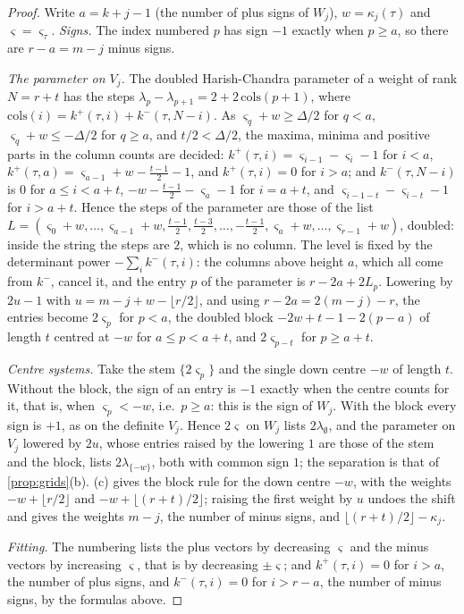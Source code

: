 \begin{proof}
Write $a=k+j-1$ (the number of plus signs of $W_j$), $w=\kappa_j(\tau)$ and $\varsigma=\varsigma_\tau$. \emph{Signs.} The index numbered $p$ has sign $-1$ exactly when $p\ge a$, so there are $r-a=m-j$ minus signs.

\emph{The parameter on $V_j$.} The doubled Harish-Chandra parameter of a weight of rank $N=r+t$ has the steps $\lambda_p-\lambda_{p+1}=2+2\,\mathrm{cols}(p+1)$, where $\mathrm{cols}(i)=k^+(\tau,i)+k^-(\tau,N-i)$. As $\varsigma_q+w\ge\Delta/2$ for $q<a$, $\varsigma_q+w\le-\Delta/2$ for $q\ge a$, and $t/2<\Delta/2$, the maxima, minima and positive parts in
the column counts are decided: $k^+(\tau,i)=\varsigma_{i-1}-\varsigma_i-1$ for $i<a$, $k^+(\tau,a)=\varsigma_{a-1}+w-\frac{t-1}2-1$, and $k^+(\tau,i)=0$ for $i>a$; and $k^-(\tau,N-i)$ is $0$ for $a\le i<a+t$, $-w-\frac{t-1}2-\varsigma_a-1$ for $i=a+t$, and $\varsigma_{i-1-t}-\varsigma_{i-t}-1$ for $i>a+t$. Hence the steps of the parameter
are those of the list $L=(\varsigma_0+w,\dots,\varsigma_{a-1}+w,\frac{t-1}2,\frac{t-3}2,\dots,-\frac{t-1}2,\varsigma_a+w,\dots,\varsigma_{r-1}+w)$, doubled: inside the string the steps are $2$, which is no column. The level is fixed by the determinant power $-\sum_ik^-(\tau,i)$: the columns above height $a$, which all come from $k^-$, cancel it,
and the entry $p$ of the parameter is $r-2a+2L_p$. Lowering by $2u-1$ with $u=m-j+w-\lfloor r/2\rfloor$, and using $r-2a=2(m-j)-r$, the entries become $2\varsigma_p$ for $p<a$, the doubled block $-2w+t-1-2(p-a)$ of length $t$ centred at $-w$ for $a\le p<a+t$, and $2\varsigma_{p-t}$ for $p\ge a+t$.

\emph{Centre systems.} Take the stem $\{2\varsigma_p\}$ and the single down centre $-w$ of length $t$. Without the block, the sign of an entry is $-1$ exactly when the centre counts for it, that is, when $\varsigma_p<-w$, i.e.\ $p\ge a$: this is the sign of $W_j$. With the block every sign is $+1$, as on the definite $V_j$. Hence $2\varsigma$
on $W_j$ lists $2\lambda_\emptyset$, and the parameter on $V_j$ lowered by $2u$, whose entries raised by the lowering $1$ are those of the stem and the block, lists $2\lambda_{\{-w\}}$, both with common sign $1$; the separation is that of \cref{prop:grids}(b). (c) gives the block rule for the down centre $-w$, with the weights $-w+\lfloor r/2\rfloor$ and $-w+\lfloor(r+t)/2\rfloor$; raising the first
weight by $u$ undoes the shift and gives the weights $m-j$, the number of minus signs, and $\lfloor(r+t)/2\rfloor-\kappa_j$.

\emph{Fitting.} The numbering lists the plus vectors by decreasing $\varsigma$ and the minus vectors by increasing $\varsigma$, that is by decreasing $\pm\varsigma$; and $k^+(\tau,i)=0$ for $i>a$, the number of plus signs, and $k^-(\tau,i)=0$ for $i>r-a$, the number of minus signs, by the formulas above.
\end{proof}
